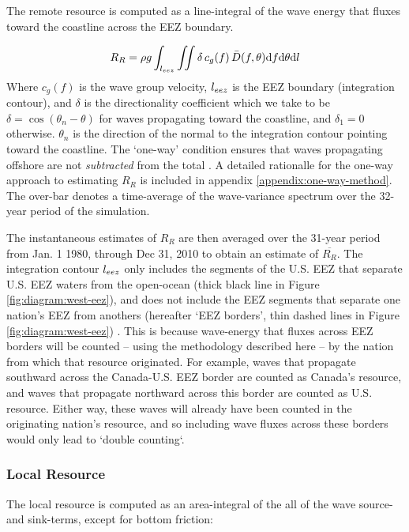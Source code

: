 The remote resource is computed as a line-integral of the wave energy that fluxes toward the coastline across the EEZ boundary. 

\begin{align}
  R_R = \rho g \int_{l_{eez}}\iint \delta \, c_g(f) \, \bar{D}(f,\theta) \mathrm{d} f \mathrm{d} \theta \mathrm{d} l
\end{align}
Where $c_g(f)$ is the wave group velocity, $l_{eez}$ is the EEZ boundary (integration contour), and $\delta$ is the directionality coefficient which we take to be $\delta = \cos(\theta_n - \theta)$ for waves propagating toward the coastline, and $\delta_1 = 0$ otherwise. $\theta_n$ is the direction of the normal to the integration contour pointing toward the coastline. The `one-way' condition ensures that waves propagating offshore are not {\em subtracted} from the total \citep[]{gunnQuantifyingGlobalWave2012}. A detailed rationalle for the one-way approach to estimating $R_R$ is included in appendix \ref{appendix:one-way-method}. The over-bar denotes a time-average of the wave-variance spectrum over the 32-year period of the simulation. 

The instantaneous estimates of $R_R$ are then averaged over the 31-year period from Jan. 1 1980, through Dec 31, 2010 to obtain an estimate of $\overline{R_R}$.
The integration contour $l_{eez}$ only includes the segments of the U.S. EEZ that separate U.S. EEZ waters from the open-ocean (thick black line in Figure \ref{fig:diagram:west-eez}), and does not include the EEZ segments that separate one nation's EEZ from anothers (hereafter `EEZ borders', thin dashed lines in Figure \ref{fig:diagram:west-eez}) \citep[]{flandersmarineinstituteMaritimeBoundariesGeodatabase2018}. This is because wave-energy that fluxes across EEZ borders will be counted -- using the methodology described here -- by the nation from which that resource originated. For example, waves that propagate southward across the Canada-U.S. EEZ border are counted as Canada's resource, and waves that propagate northward across this border are counted as U.S. resource. Either way, these waves will already have been counted in the originating nation's resource, and so including wave fluxes across these borders would only lead to `double counting`.


\subsubsection{Local Resource} \label{sec:method:calc:local}

The local resource is computed as an area-integral of the all of the wave source- and sink-terms, except for bottom friction:

